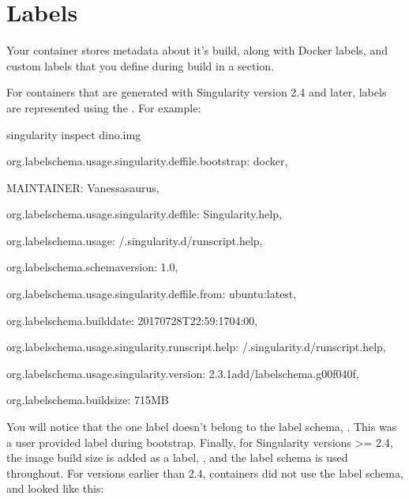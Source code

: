 \documentclass[letterpaper,10pt,english]{sphinxmanual}
\begin{document}
\section{Labels}
\label{\detokenize{environment_and_metadata:labels}}
Your container stores metadata about it’s build, along with Docker
labels, and custom labels that you define during build in a  section.

For containers that are generated with Singularity version 2.4 and
later, labels are represented using the . For
example:

%
\begin{sphinxVerbatim}[commandchars=\\\{\}]
\PYGZdl{} singularity inspect dino.img

\PYGZob{}

    \PYGZdq{}org.label\PYGZhy{}schema.usage.singularity.deffile.bootstrap\PYGZdq{}: \PYGZdq{}docker\PYGZdq{},

    \PYGZdq{}MAINTAINER\PYGZdq{}: \PYGZdq{}Vanessasaurus\PYGZdq{},

    \PYGZdq{}org.label\PYGZhy{}schema.usage.singularity.deffile\PYGZdq{}: \PYGZdq{}Singularity.help\PYGZdq{},

    \PYGZdq{}org.label\PYGZhy{}schema.usage\PYGZdq{}: \PYGZdq{}/.singularity.d/runscript.help\PYGZdq{},

    \PYGZdq{}org.label\PYGZhy{}schema.schema\PYGZhy{}version\PYGZdq{}: \PYGZdq{}1.0\PYGZdq{},

    \PYGZdq{}org.label\PYGZhy{}schema.usage.singularity.deffile.from\PYGZdq{}: \PYGZdq{}ubuntu:latest\PYGZdq{},

    \PYGZdq{}org.label\PYGZhy{}schema.build\PYGZhy{}date\PYGZdq{}: \PYGZdq{}2017\PYGZhy{}07\PYGZhy{}28T22:59:17\PYGZhy{}04:00\PYGZdq{},

    \PYGZdq{}org.label\PYGZhy{}schema.usage.singularity.runscript.help\PYGZdq{}: \PYGZdq{}/.singularity.d/runscript.help\PYGZdq{},

    \PYGZdq{}org.label\PYGZhy{}schema.usage.singularity.version\PYGZdq{}: \PYGZdq{}2.3.1\PYGZhy{}add/label\PYGZhy{}schema.g00f040f\PYGZdq{},

    \PYGZdq{}org.label\PYGZhy{}schema.build\PYGZhy{}size\PYGZdq{}: \PYGZdq{}715MB\PYGZdq{}

\PYGZcb{}
\end{sphinxVerbatim}

You will notice that the one label doesn’t belong to the label schema,  .
This was a user provided label during bootstrap. Finally, for
Singularity versions \textgreater{}= 2.4, the image build size is added as a label, ,
and the label schema is used throughout. For versions earlier than 2.4,
containers did not use the label schema, and looked like this:
\end{document}
